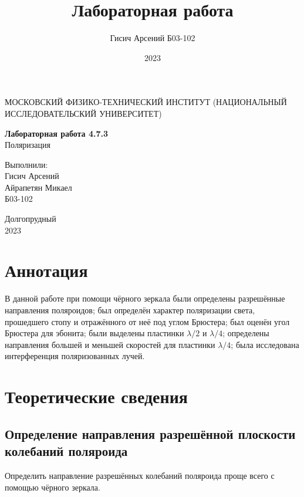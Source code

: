 \documentclass[a4paper, 12pt]{article}
\title{Лабораторная работа}
\author{Гисич Арсений Б03-102}
\date{2023}
\begin{document}
	\begin{center}
		{\large МОСКОВСКИЙ ФИЗИКО-ТЕХНИЧЕСКИЙ ИНСТИТУТ (НАЦИОНАЛЬНЫЙ ИССЛЕДОВАТЕЛЬСКИЙ УНИВЕРСИТЕТ)}
	\end{center}
	\vspace{5 cm}
	{\Large
		\begin{center}
			{\bf Лабораторная работа 4.7.3}\\[0.2 cm]
			Поляризация
		\end{center}
	}
	\vspace{4 cm}
	\begin{flushright}
		{\Large Выполнили: \\
			\vspace{0.2 cm}
			Гисич Арсений \\
            Айрапетян Микаел \\
			\vspace{0.2 cm}
			Б03-102 \\}
	\end{flushright}
	\vspace{8 cm}
	\begin{center}
		Долгопрудный\\[0.1 cm]
		2023
	\end{center}
\thispagestyle{empty}

\section{Аннотация}

В данной работе при помощи чёрного зеркала были определены разрешённые направления поляроидов; был определён характер поляризации света, прошедшего стопу и отражённого от неё под углом Брюстера; был оценён угол Брюстера для эбонита; были выделены пластинки $\lambda/2$ и $\lambda/4$; определены направления большей и меньшей скоростей для пластинки $\lambda/4$; была исследована интерференция поляризованных лучей.

\section{Теоретические сведения}

\subsection{Определение направления разрешённой плоскости колебаний поляроида}
	
	Определить направление разрешённых колебаний поляроида проще всего с помощью чёрного зеркала.
	
\end{document}
